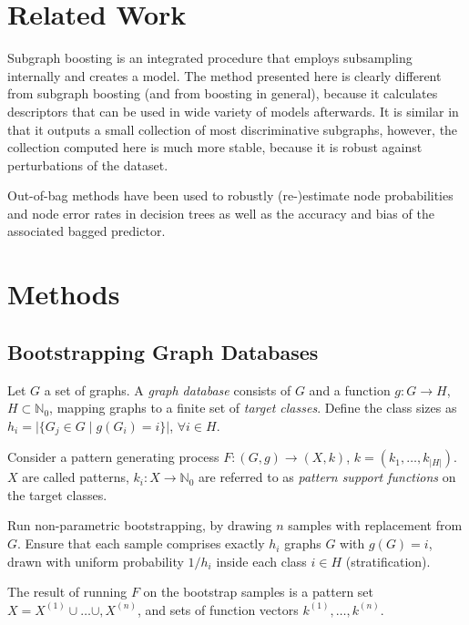 \documentclass{article}
\begin{document}
\section{Related Work}

Subgraph boosting \cite{saigo09gboost} is an integrated procedure that employs subsampling internally and creates a model. The method presented here is clearly different from subgraph boosting (and from boosting in general), because it calculates descriptors that can be used in wide variety of models afterwards. It is similar in that it outputs a small collection of most discriminative subgraphs, however, the collection computed here is much more stable, because it is robust against perturbations of the dataset.

Out-of-bag methods have been used to robustly (re-)estimate node probabilities and node error rates in decision trees \cite{breiman96oob} as well as the accuracy \cite{bylander02estimating, breiman96oob} and bias \cite{bylander02estimating} of the associated bagged predictor.

\section{Methods}
\subsection{Bootstrapping Graph Databases}
Let $G$ a set of graphs. A \emph{graph database} consists of $G$ and a function $g: G \rightarrow H$, $H \subset \mathbb{N}_0$, mapping graphs to a finite set of \emph{target classes}. Define the class sizes as $h_i=\vert\{G_j \in G \; \vert\; g(G_i)=i\}\vert$, $\forall i \in H$.

Consider a pattern generating process $F: (G,g) \rightarrow (X,k)$, $k=\left(k_1,\ldots,k_{\vert H\vert}\right)$. $X$ are called patterns, $k_i: X \rightarrow \mathbb{N}_0$ are referred to as \emph{pattern support functions} on the target classes.

Run non-parametric bootstrapping, by drawing $n$ samples with replacement from $G$. Ensure that each sample comprises exactly $h_i$ graphs $G$ with $g(G)=i$, drawn with uniform probability $1/h_i$ inside each class $i \in H$ (stratification).

The result of running $F$ on the bootstrap samples is a pattern set $X= X^{(1)}\cup\ldots\cup,X^{(n)}$, and sets of function vectors $k^{(1)},\ldots,k^{(n)}$.
\end{document}
